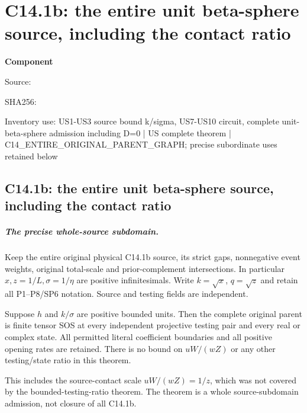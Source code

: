 \chapter{C14.1b: the entire unit beta-sphere source, including the contact ratio}
\label{component:p0931b3af19ec}
\noindent\textbf{Component }\par
{\small\noindent Source: \par}
{\small\noindent SHA256: \par}
{\small\noindent Inventory use: US1-US3 source bound k/sigma, US7-US10 circuit, complete unit-beta-sphere admission including D=0 | US complete theorem | C14\_\allowbreak{}ENTIRE\_\allowbreak{}ORIGINAL\_\allowbreak{}PARENT\_\allowbreak{}GRAPH; precise subordinate uses retained below\par}
\medskip
\section{C14.1b: the entire unit beta-sphere source, including the contact ratio}
\label{p0931b3af19ec:sec:c141b-unit-beta-sphere}

\paragraph{The precise whole-source subdomain.}
Keep the entire original physical C14.1b source, its strict gaps,
nonnegative event weights, original total-scale and prior-complement
intersections. In particular $x,z=1/L,\sigma=1/\eta$ are positive
infinitesimals. Write $k=\sqrt x$, $q=\sqrt z$ and retain all
P1--P8/SP6 notation. Source and testing fields are independent.

\begin{theorem}
Suppose $h$ and $k/\sigma$ are positive bounded units. Then the
complete original parent is finite tensor SOS at every independent
projective testing pair and every real or complex state. All permitted
literal coefficient boundaries and all positive opening rates are
retained. There is no bound on $uW/(wZ)$ or any other testing/state
ratio in this theorem.
\end{theorem}

This includes the source-contact scale $uW/(wZ)=1/z$, which was not
covered by the bounded-testing-ratio theorem. The theorem is a whole
source-subdomain admission, not closure of all C14.1b.

